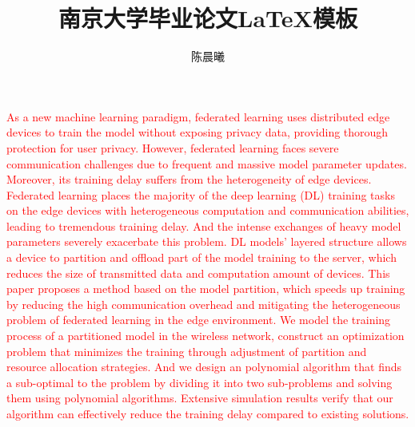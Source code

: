 \documentclass[winfonts,master,twoside]{njuthesis}
\title{南京大学毕业论文\LaTeX 模板}
\author{陈晨曦}
\institute{南京大学}
\begin{document}

\maketitle
\makeenglishtitle


\frontmatter

\begin{abstract}
\lipsum[1-2]


\end{abstract}

\begin{englishabstract}
\textcolor{red}{As a new machine learning paradigm, federated learning uses distributed edge devices to train the model without exposing privacy data, providing thorough protection for user privacy. However, federated learning faces severe communication challenges due to frequent and massive model parameter updates. Moreover, its training delay suffers from the heterogeneity of edge devices. 
Federated learning places the majority of the deep learning (DL) training tasks on the edge devices with heterogeneous computation and communication abilities, leading to tremendous training delay. And the intense exchanges of heavy model parameters severely exacerbate this problem. DL models' layered structure allows a device to partition and offload part of the model training to the server, which reduces the size of transmitted data and computation amount of devices. This paper proposes a method based on the model partition, which speeds up training by reducing the high communication overhead and mitigating the heterogeneous problem of federated learning in the edge environment. We model the training process of a partitioned model in the wireless network, construct an optimization problem that minimizes the training through adjustment of partition and resource allocation strategies. And we design an polynomial algorithm that finds a sub-optimal to the problem by dividing it into two sub-problems and solving them using polynomial algorithms. Extensive simulation results verify that our algorithm can effectively reduce the training delay compared to existing solutions.}

\end{englishabstract}
\end{document}
